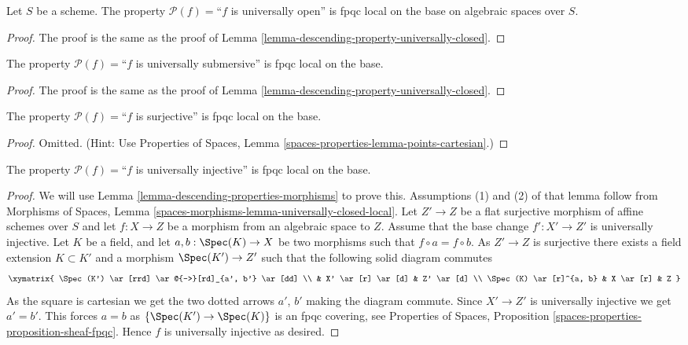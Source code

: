 \begin{lemma}
\label{lemma-descending-property-universally-open}
Let $S$ be a scheme.
The property $\mathcal{P}(f) =$``$f$ is universally open''
is fpqc local on the base on algebraic spaces over $S$.
\end{lemma}

\begin{proof}
The proof is the same as the proof of
Lemma \ref{lemma-descending-property-universally-closed}.
\end{proof}

\begin{lemma}
\label{lemma-descending-property-universally-submersive}
The property $\mathcal{P}(f) =$``$f$ is universally submersive''
is fpqc local on the base.
\end{lemma}

\begin{proof}
The proof is the same as the proof of
Lemma \ref{lemma-descending-property-universally-closed}.
\end{proof}

\begin{lemma}
\label{lemma-descending-property-surjective}
The property $\mathcal{P}(f) =$``$f$ is surjective''
is fpqc local on the base.
\end{lemma}

\begin{proof}
Omitted. (Hint: Use
Properties of Spaces, Lemma \ref{spaces-properties-lemma-points-cartesian}.)
\end{proof}

\begin{lemma}
\label{lemma-descending-property-universally-injective}
The property $\mathcal{P}(f) =$``$f$ is universally injective''
is fpqc local on the base.
\end{lemma}

\begin{proof}
We will use
Lemma \ref{lemma-descending-properties-morphisms}
to prove this. Assumptions (1) and (2) of that lemma follow from
Morphisms of Spaces,
Lemma \ref{spaces-morphisms-lemma-universally-closed-local}.
Let $Z' \to Z$ be a flat surjective morphism of affine schemes
over $S$ and let $f : X \to Z$ be a morphism from an algebraic space to $Z$.
Assume that the base change $f' : X' \to Z'$ is universally injective.
Let $K$ be a field, and let $a, b : \Spec(K) \to X$
be two morphisms such that $f \circ a = f \circ b$.
As $Z' \to Z$ is surjective there exists a field
extension $K \subset K'$ and a morphism
$\Spec(K') \to Z'$
such that the following solid diagram commutes
$$
\xymatrix{
\Spec(K') \ar[rrd] \ar@{-->}[rd]_{a', b'} \ar[dd] \\
 &
X' \ar[r] \ar[d] &
Z' \ar[d] \\
\Spec(K) \ar[r]^{a, b} &
X \ar[r] &
Z
}
$$
As the square is cartesian we get the two dotted arrows $a'$, $b'$ making the
diagram commute. Since $X' \to Z'$ is universally injective we get $a' = b'$.
This forces $a = b$ as $\{\Spec(K') \to \Spec(K)\}$
is an fpqc covering, see
Properties of Spaces, Proposition
\ref{spaces-properties-proposition-sheaf-fpqc}.
Hence $f$ is universally injective as desired.
\end{proof}

